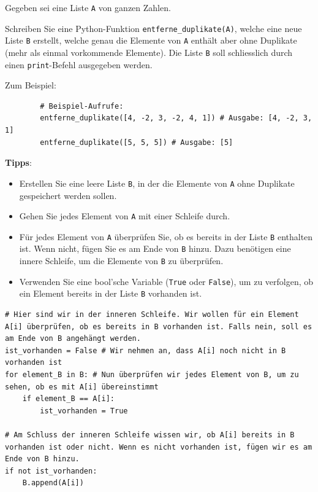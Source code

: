 \begin{myexercise}
	Gegeben sei eine Liste \texttt{A} von ganzen Zahlen.

	Schreiben Sie eine Python-Funktion \lstinline|entferne_duplikate(A)|, welche eine neue Liste \texttt{B} erstellt, welche genau die Elemente von \texttt{A} enthält aber ohne Duplikate (mehr als einmal vorkommende Elemente). Die Liste \texttt{B} soll schliesslich durch einen \lstinline|print|-Befehl ausgegeben werden.

	Zum Beispiel:
	\begin{lstlisting}
		# Beispiel-Aufrufe:
		entferne_duplikate([4, -2, 3, -2, 4, 1]) # Ausgabe: [4, -2, 3, 1]
		entferne_duplikate([5, 5, 5]) # Ausgabe: [5]
	\end{lstlisting}

	\textbf{Tipps}: %
	\begin{itemize}
		\item Erstellen Sie eine leere Liste \texttt{B}, in der die Elemente von \texttt{A} ohne Duplikate gespeichert werden sollen.
		\item Gehen Sie jedes Element von \texttt{A} mit einer Schleife durch.
		\item Für jedes Element von \texttt{A} überprüfen Sie, ob es bereits in der Liste \texttt{B} enthalten ist. Wenn nicht, fügen Sie es am Ende von \texttt{B} hinzu. Dazu benötigen eine innere Schleife, um die Elemente von \texttt{B} zu überprüfen.
		\item Verwenden Sie eine bool'sche Variable (\lstinline|True| oder \lstinline|False|), um zu verfolgen, ob ein Element bereits in der Liste \texttt{B} vorhanden ist.
	\end{itemize}
	\begin{minipage}{\textwidth}
		\begin{lstlisting}
# Hier sind wir in der inneren Schleife. Wir wollen für ein Element A[i] überprüfen, ob es bereits in B vorhanden ist. Falls nein, soll es am Ende von B angehängt werden.
ist_vorhanden = False # Wir nehmen an, dass A[i] noch nicht in B vorhanden ist
for element_B in B: # Nun überprüfen wir jedes Element von B, um zu sehen, ob es mit A[i] übereinstimmt
	if element_B == A[i]:
		ist_vorhanden = True

# Am Schluss der inneren Schleife wissen wir, ob A[i] bereits in B vorhanden ist oder nicht. Wenn es nicht vorhanden ist, fügen wir es am Ende von B hinzu.
if not ist_vorhanden:
	B.append(A[i])
		\end{lstlisting}
	\end{minipage}

	\begin{myanswer}
		
	\end{myanswer}
\end{myexercise}

